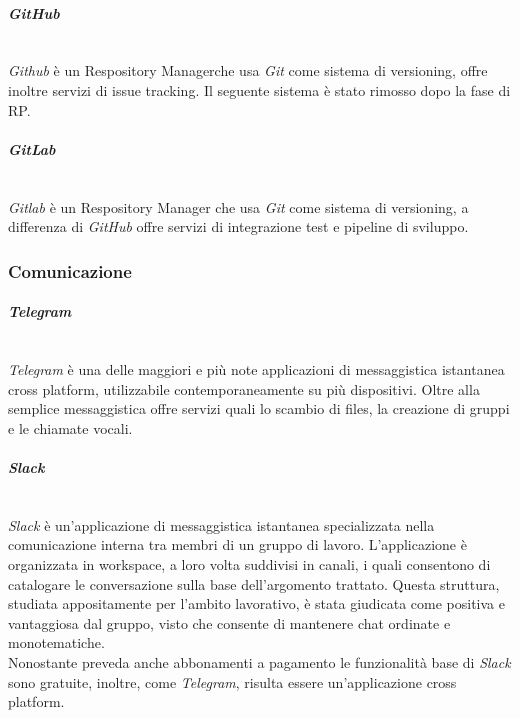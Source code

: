 \paragraph{\textit{GitHub}} ~\\
	\textit{Github} è un Respository Manager\glossario che usa \textit{Git} come sistema di versioning, offre inoltre 	servizi di issue tracking\glossario. Il seguente sistema è stato rimosso dopo la fase di RP.
	
\paragraph{\textit{GitLab}} \-\\
	\textit{Gitlab} è un Respository Manager che usa \textit{Git} come sistema di versioning, a differenza di \textit{GitHub} offre servizi di integrazione test e pipeline di sviluppo. 

\subsubsection{Comunicazione}

\paragraph{\textit{Telegram}} ~\\
	\textit{Telegram} è una delle maggiori e più note applicazioni di messaggistica istantanea cross platform, 					utilizzabile contemporaneamente su più dispositivi. Oltre alla semplice messaggistica offre servizi quali lo 				scambio di files, la creazione di gruppi e le chiamate vocali.

\paragraph{\textit{Slack}} ~\\
	\textit{Slack} è un'applicazione di messaggistica istantanea specializzata nella comunicazione interna tra membri di un gruppo di lavoro. L'applicazione è organizzata in workspace, a loro volta suddivisi in canali, i quali 			consentono di catalogare le conversazione sulla base dell'argomento trattato. Questa struttura, studiata 						appositamente per l'ambito lavorativo, è stata giudicata come positiva e vantaggiosa dal gruppo, visto che 					consente di mantenere chat ordinate e monotematiche.\\
	Nonostante preveda anche abbonamenti a pagamento le funzionalità base di \textit{Slack} sono gratuite, inoltre, come \textit{Telegram}, risulta essere un'applicazione cross platform\glossario.

